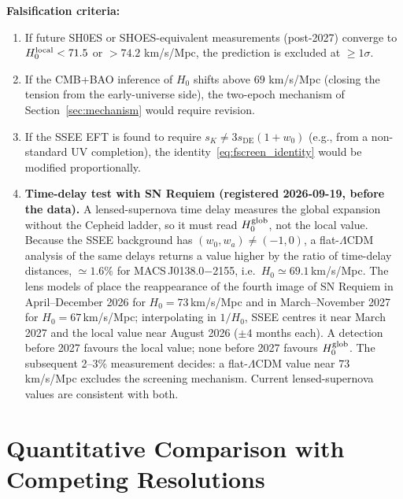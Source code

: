 \documentclass[12pt,a4paper]{article}
\newcommand{\sK}{s_K}          %
\newcommand{\sDE}{s_{\mathrm{DE}}} %
\begin{document}
\noindent\textbf{Falsification criteria:}
\begin{enumerate}
  \item If future SH0ES or SHOES-equivalent measurements (post-2027)
        converge to $H_0^{\rm local} < 71.5$ or $> 74.2$ km/s/Mpc,
        the prediction is excluded at $\geq 1\sigma$.
  \item If the CMB+BAO inference of $H_0$ shifts above $69$ km/s/Mpc
        (closing the tension from the early-universe side), the two-epoch
        mechanism of Section~\ref{sec:mechanism} would require revision.
  \item If the SSEE EFT is found to require $\sK \neq 3\sDE(1+w_0)$
        (e.g., from a non-standard UV completion), the identity~\eqref{eq:fscreen_identity}
        would be modified proportionally.
  \item \textbf{Time-delay test with SN Requiem (registered 2026-09-19,
        before the data).}
        A lensed-supernova time delay measures the global expansion without
        the Cepheid ladder, so it must read $H_0^{\rm glob}$, not the local
        value. Because the SSEE background has $(w_0,w_a)\neq(-1,0)$, a
        flat-$\Lambda$CDM analysis of the same delays returns a value higher
        by the ratio of time-delay distances, $\simeq 1.6\%$ for
        MACS\,J0138.0$-$2155, i.e.\ $H_0\simeq 69.1$\,km/s/Mpc.
        The lens models of \citet{Suyu2026} place the reappearance of the
        fourth image of SN Requiem in April--December 2026 for
        $H_0=73$\,km/s/Mpc and in March--November 2027 for
        $H_0=67$\,km/s/Mpc; interpolating in $1/H_0$, SSEE centres it near
        March 2027 and the local value near August 2026 ($\pm 4$ months each).
        A detection before 2027 favours the local value; none before 2027
        favours $H_0^{\rm glob}$. The subsequent 2--3\% measurement decides:
        a flat-$\Lambda$CDM value near $73$\,km/s/Mpc excludes the screening
        mechanism. Current lensed-supernova values \citep{Pierel2025,Bazzanini2026}
        are consistent with both.
\end{enumerate}

\section{Quantitative Comparison with Competing Resolutions}
\label{sec:comparison}
\end{document}
